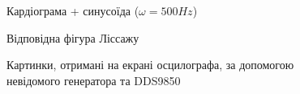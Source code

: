 \begin{figure}[h]
\begin{minipage}[h]{0.47\linewidth}
	\end{minipage}
	\vfill
	\begin{minipage}[h]{0.47\linewidth}
		 Кардіограма + синусоїда ($\omega = 500Hz$)\\
	\end{minipage}
	\hfill
	\begin{minipage}[h]{0.47\linewidth}
		 Відповідна фігура Ліссажу \\
	\end{minipage}
	\caption{Картинки, отримані на екрані осцилографа, за допомогою невідомого генератора та DDS9850}
	\label{fig:part22}
\end{figure}

